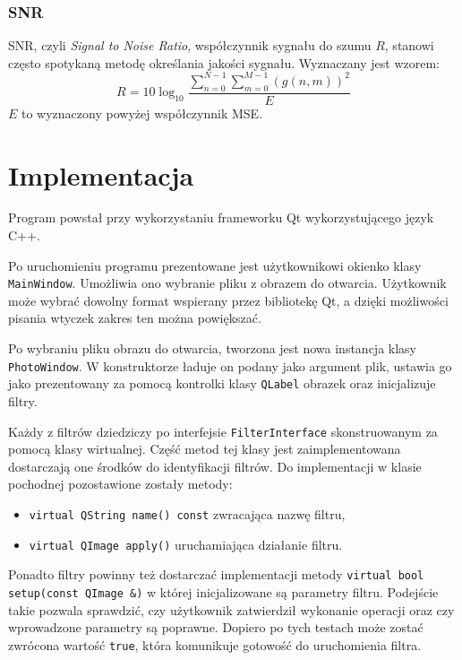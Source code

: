 \documentclass{classrep}
\begin{document}
\subsubsection{SNR}
SNR, czyli \textit{Signal to Noise Ratio}, współczynnik sygnału do szumu $R$, stanowi często spotykaną metodę określania jakości sygnału. Wyznaczany jest wzorem:
\begin{equation}
 R = 10 \log_{10} \frac{\displaystyle \sum \limits_{n=0}^{N-1} \sum \limits_{m=0}^{M-1} \left(g\left(n, m\right)\right)^2}{E}
\end{equation}
$E$ to wyznaczony powyżej współczynnik MSE.

\section{Implementacja}
Program powstał przy wykorzystaniu frameworku Qt wykorzystującego język C++.

Po uruchomieniu programu prezentowane jest użytkownikowi okienko klasy \texttt{MainWindow}. Umożliwia ono wybranie pliku z obrazem do otwarcia. Użytkownik może wybrać dowolny format wspierany przez bibliotekę Qt, a dzięki możliwości pisania wtyczek \ppauza zakres ten można powiększać.

Po wybraniu pliku obrazu do otwarcia, tworzona jest nowa instancja klasy \texttt{PhotoWindow}. W konstruktorze ładuje on podany jako argument plik, ustawia go jako prezentowany za pomocą kontrolki klasy \texttt{QLabel} obrazek oraz inicjalizuje filtry.

Każdy z filtrów dziedziczy po interfejsie \texttt{FilterInterface} skonstruowanym za pomocą klasy wirtualnej. Część metod tej klasy jest zaimplementowana \ppauza dostarczają one środków do identyfikacji filtrów. Do implementacji w klasie pochodnej pozostawione zostały metody:
\begin{itemize}
 \item \texttt{virtual QString name() const} \ppauza zwracająca nazwę filtru,
 \item \texttt{virtual QImage apply()} \ppauza uruchamiająca działanie filtru.
\end{itemize}

Ponadto filtry powinny też dostarczać implementacji metody \texttt{virtual bool setup(const QImage \&)} w której inicjalizowane są parametry filtru. Podejście takie pozwala sprawdzić, czy użytkownik zatwierdził wykonanie operacji oraz czy wprowadzone parametry są poprawne. Dopiero po tych testach może zostać zwrócona wartość \texttt{true}, która komunikuje gotowość do uruchomienia filtra.
\end{document}
